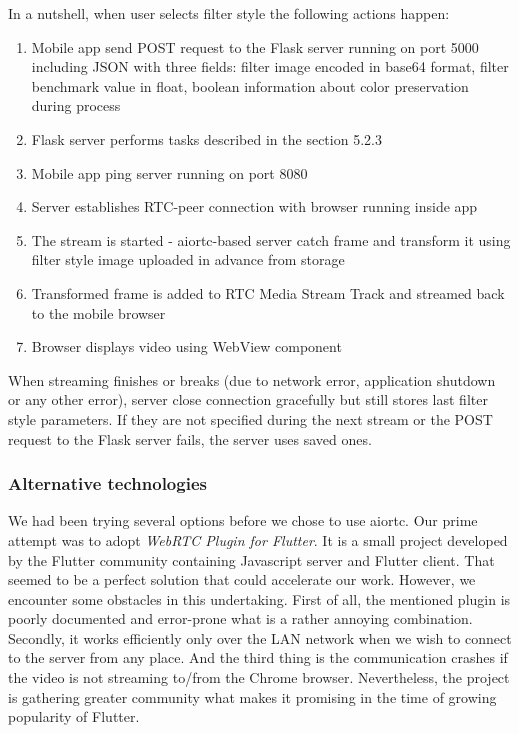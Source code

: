 \documentclass[../Main.tex]{subfiles}
\begin{document}
    In a nutshell, when user selects filter style the following actions happen:
    \begin{enumerate}
    \item Mobile app send POST request to the Flask server running on port 5000 including JSON with three fields: filter image encoded in base64 format, filter benchmark value in float, boolean information about color preservation during process 
    \item Flask server performs tasks described in the section 5.2.3
    \item Mobile app ping server running on port 8080
    \item Server establishes RTC-peer connection with browser running inside app
    \item The stream is started - aiortc-based server catch frame and transform it using filter style image uploaded in advance from storage
    \item Transformed frame is added to RTC Media Stream Track and streamed back to the mobile browser
    \item Browser displays video using WebView component 
    \end{enumerate}
    
    When streaming finishes or breaks (due to network error, application shutdown or any other error), server close connection gracefully but still stores last filter style parameters. If they are not specified during the next stream or the POST request to the Flask server fails, the server uses saved ones. 
    
    \subsubsection{Alternative technologies}
    We had been trying several options before we chose to use aiortc. Our prime attempt was to adopt \textit{WebRTC Plugin for Flutter}. It is a small project developed by the Flutter community containing Javascript server and Flutter client. That seemed to be a perfect solution that could accelerate our work.
    However, we encounter some obstacles in this undertaking. First of all, the mentioned plugin is poorly documented and error-prone what is a rather annoying combination. Secondly, it works efficiently only over the LAN network when we wish to connect to the server from any place. And the third thing is the communication crashes if the video is not streaming to/from the Chrome browser. Nevertheless, the project is gathering greater community what makes it promising in the time of growing popularity of Flutter.
   
\end{document}
